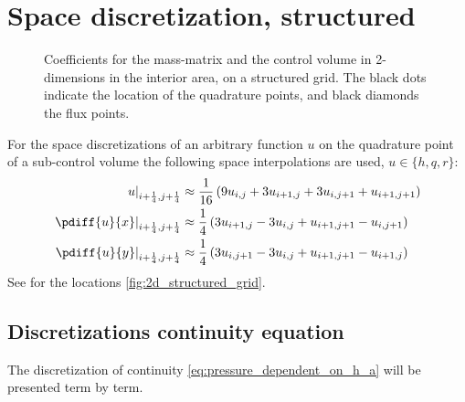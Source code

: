 \section{Space discretization, structured}
\begin{figure}[H]
    \begin{center}
        \def\svgwidth{0.80\textwidth} %
        \resizebox{0.65\textwidth}{!}{
            
        }
    \end{center}
    \caption[Definition of the grid to solve the 2D-shallow water equations in the interior area]{Coefficients for the mass-matrix and the control volume in 2-dimensions in the interior area, on a structured grid. The black dots indicate the location of the quadrature points, and black diamonds the flux points.}
    \label{fig:2d_structured_grid}
\end{figure}
For the space discretizations of an arbitrary function $u$ on the quadrature point of a sub-control volume the following space interpolations are used, $u \in \{h,q,r\}$:
\begin{align}
    \left. u\right|_{i+\quart, j+\quart} & \approx \frac{1}{16}\left( 9u_{i, j} + 3 u_{i+1,j}  + 3  u_{i, j+1} + u_{i+1, j+1}\right)
    \\
    \left. \pdiff{u}{x}\right|_{i+\quart, j+\quart} & \approx \quart \left( 3 u_{i+1,j} - 3 u_{i,j} + u_{i+1, j+1} - u_{i, j+1} \right)
    \\
    \left. \pdiff{u}{y}\right|_{i+\quart, j+\quart} & \approx \quart \left( 3 u_{i, j+1} - 3 u_{i, j} + u_{i+1, j+1} - u_{i+1, j}\right)
\end{align}
See for the locations \autoref{fig:2d_structured_grid}.
\subsection{Discretizations continuity equation}
The discretization of continuity \autoref{eq:pressure_dependent_on_h_a} will be presented term by term.
